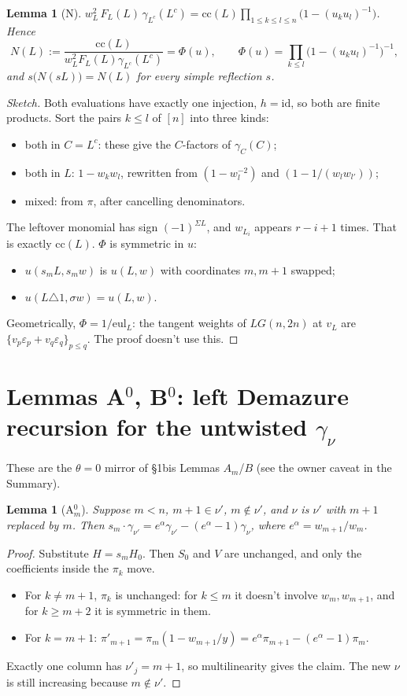 \documentclass[11pt]{article}
\newcommand{\cc}{\mathrm{cc}}
\newcommand{\eul}{\mathrm{eul}}
\newtheorem{lemma}[theorem]{Lemma}
\theoremstyle{remark}
\begin{document}
\begin{lemma}[N]
$w_L^2\,F_L(L)\,\gamma_{L^c}(L^c)=\cc(L)\prod_{1\le k\le l\le n}\bigl(1-(u_ku_l)^{-1}\bigr)$. Hence
\[
N(L):=\frac{\cc(L)}{w_L^2F_L(L)\gamma_{L^c}(L^c)}=\Phi(u),\qquad \Phi(u)=\prod_{k\le l}\bigl(1-(u_ku_l)^{-1}\bigr)^{-1},
\]
and $s\big(N(sL)\big)=N(L)$ for every simple reflection $s$.
\end{lemma}
\begin{proof}[Sketch]
Both evaluations have exactly one injection, $h=\mathrm{id}$, so both are finite products. Sort the pairs $k\le l$ of $[n]$ into
three kinds:
\begin{itemize}[leftmargin=*,itemsep=1pt]
\item both in $C=L^c$: these give the $C$-factors of $\gamma_C(C)$;
\item both in $L$: $1-w_kw_l$, rewritten from $(1-w_l^{-2})$ and $(1-1/(w_lw_{l'}))$;
\item mixed: from $\pi$, after cancelling denominators.
\end{itemize}
The leftover monomial has sign $(-1)^{\Sigma L}$, and $w_{L_i}$ appears $r-i+1$ times. That is exactly $\cc(L)$.
$\Phi$ is symmetric in $u$:
\begin{itemize}[leftmargin=*,itemsep=1pt]
\item $u(s_mL,s_mw)$ is $u(L,w)$ with coordinates $m,m+1$ swapped;
\item $u(L\triangle1,\sigma w)=u(L,w)$.
\end{itemize}
Geometrically, $\Phi=1/\eul_L$: the tangent weights of $LG(n,2n)$ at $v_L$ are $\{v_p\varepsilon_p+v_q\varepsilon_q\}_{p\le q}$.
The proof doesn't use this.
\end{proof}

\section{Lemmas A$^0$, B$^0$: left Demazure recursion for the untwisted $\gamma_\nu$}
These are the $\theta=0$ mirror of \S1bis Lemmas $A_m$/$B$ (see the owner caveat in the Summary).

\begin{lemma}[A$^0_m$]
Suppose $m<n$, $m+1\in\nu'$, $m\notin\nu'$, and $\nu$ is $\nu'$ with $m+1$ replaced by $m$. Then
$s_m\cdot\gamma_{\nu'}=e^{\alpha}\gamma_{\nu'}-(e^{\alpha}-1)\gamma_\nu$, where $e^\alpha=w_{m+1}/w_m$.
\end{lemma}
\begin{proof}
Substitute $H=s_mH_0$. Then $S_0$ and $V$ are unchanged, and only the coefficients inside the $\pi_k$ move.
\begin{itemize}[leftmargin=*,itemsep=1pt]
\item For $k\ne m+1$, $\pi_k$ is unchanged: for $k\le m$ it doesn't involve $w_m,w_{m+1}$, and for $k\ge m+2$ it is symmetric in them.
\item For $k=m+1$: $\pi'_{m+1}=\pi_m(1-w_{m+1}/y)=e^\alpha\pi_{m+1}-(e^\alpha-1)\pi_m$.
\end{itemize}
Exactly one column has $\nu'_j=m+1$, so multilinearity gives the claim. The new $\nu$ is still increasing because $m\notin\nu'$.
\end{proof}
\end{document}

